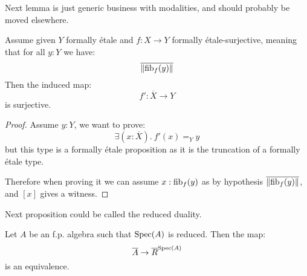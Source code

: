 Next lemma is just generic business with modalities, and should probably be moved elsewhere.

\begin{lemma}\label{surjectivity-for-formally-etale}
Assume given $Y$ formally étale and $f:X\to Y$ formally étale-surjective, meaning that for all $y:Y$ we have:
\[\overline{\lVert \mathrm{fib}_f(y) \rVert}\]
Then the induced map:
\[f' : \overline{X}\to Y\]
is surjective.
\end{lemma}

\begin{proof}
Assume $y:Y$, we want to prove:
\[\exists(x:\overline{X}).\ f'(x) =_Y y\]
but this type is a formally étale proposition as it is the truncation of a formally étale type.

Therefore when proving it we can assume $x:\mathrm{fib}_f(y)$ as by hypothesis $\overline{\lVert \mathrm{fib}_f(y) \rVert}$, and $[x]$ gives a witness.
\end{proof}

Next proposition could be called the reduced duality.

\begin{proposition}\label{duality-reduced-algebras}
Let $A$ be an f.p. algebra such that $\operatorname{Spec}(A)$ is reduced. Then the map:
\[\overline{A} \to \overline{R}^{\operatorname{Spec}(A)}\]
is an equivalence.
\end{proposition}

